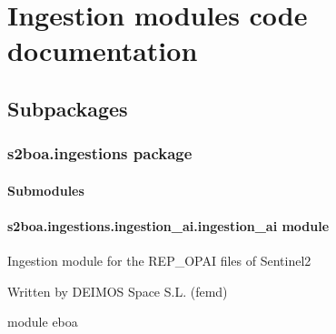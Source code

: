 \chapter{Ingestion modules code documentation}
\section{Subpackages}
\label{\detokenize{s2boa:subpackages}}

\subsection{s2boa.ingestions package}
\label{\detokenize{s2boa.ingestions:s2boa-ingestions-package}}\label{\detokenize{s2boa.ingestions::doc}}

\subsubsection{Submodules}
\label{\detokenize{s2boa.ingestions:submodules}}

\subsubsection{s2boa.ingestions.ingestion\_ai.ingestion\_ai module}
\label{\detokenize{s2boa.ingestions:module-s2boa.ingestions.ingestion_ai.ingestion_ai}}\label{\detokenize{s2boa.ingestions:s2boa-ingestions-ingestion-ai-ingestion-ai-module}}
\sphinxAtStartPar
Ingestion module for the REP\_OPAI files of Sentinel\sphinxhyphen{}2

\sphinxAtStartPar
Written by DEIMOS Space S.L. (femd)

\sphinxAtStartPar
module eboa

